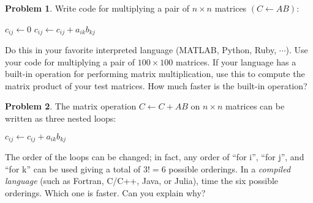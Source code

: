 \documentclass{article}
\theoremstyle{definition}
\newtheorem{problem}{Problem}[subsection]
\newcommand{\courier}[1]{{\fontfamily{pcr}\selectfont#1}}
\begin{document}
	\setcounter{section}{1}
	\setcounter{subsection}{1}
	
	\setcounter{problem}{0}
	\begin{problem}
		Write code for multiplying a pair of \(n \times n\) matrices \((C\gets AB)\):
		\begin{figure*}[h!]
			\centering
			\begin{algorithmic}
				\State \(c_{ij}\gets 0\)
				\State \(c_{ij}\gets c_{ij} + a_{ik}b_{kj}\)
				\EndFor
				\EndFor
				\EndFor
			\end{algorithmic}
		\end{figure*}
	
		\noindent Do this in your favorite interpreted language (MATLAB, Python, Ruby, \(\cdots\)). Use your code for multiplying a pair of \(100\times 100\) matrices. If your language has a built-in operation for performing matrix multiplication, use this to compute the matrix product of your test matrices. How much faster is the built-in operation?
	\end{problem}
	
	\newpage
	\setcounter{problem}{1}
	\begin{problem}
		The matrix operation \(C\gets C + AB\) on \(n\times n\) matrices can be written as three nested loops:
		\begin{figure*}[h!]
			\centering
			\begin{algorithmic}
				\For{\(i = 1,2,\ldots,n\)}
				\For{\(j = 1,2,\ldots,n\)}
				\For{\(k = 1,2,\ldots,n\)}
				\State \(c_{ij}\gets c_{ij} + a_{ik}b_{kj}\)
				\EndFor
				\EndFor
				\EndFor
			\end{algorithmic}
		\end{figure*}
	The order of the loops can be changed; in fact, any order of ``\courier{for i}'', ``\courier{for j}'', and ``\courier{for k}'' can be used giving a total of \(3!=6\) possible orderings. In a \textit{compiled language} (such as Fortran, C/C++, Java, or Julia), time the six possible orderings. Which one is faster. Can you explain why?
	\end{problem}
	
\end{document}
